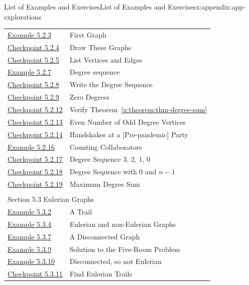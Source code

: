 \documentclass[oneside,10pt,]{book}
\newcommand{\xreffont}{\relax}
\numberwithin{equation}{section}
\begin{document}
\begin{appendixptx}{List of Examples and Exercises}{}{List of Examples and Exercises}{}{}{x:appendix:app-explorations}
\begin{longtable}[l]{ll}
\hyperref[x:example:eg-graph-first]{Example 5.2.3}& First Graph\\
\hyperref[x:exercise:ex-graph-first-draw]{Checkpoint 5.2.4}& Draw These Graphs\\
\hyperref[x:exercise:ex-graph-first-list]{Checkpoint 5.2.5}& List Vertices and Edges\\
\hyperref[x:example:eg-graph-degree]{Example 5.2.7}& Degree sequence\\
\hyperref[x:exercise:ex-graph-degree]{Checkpoint 5.2.8}& Write the Degree Sequence\\
\hyperref[x:exercise:ex-graph-degree-zero]{Checkpoint 5.2.9}& Zero Degrees\\
\hyperref[x:exercise:ex-graph-degsum]{Checkpoint 5.2.12}& Verify Theorem~{\xreffont\ref*{x:theorem:thm-degree-sum}}\\
\hyperref[x:exercise:ex-graph-handshake]{Checkpoint 5.2.13}& Even Number of Odd Degree Vertices\\
\hyperref[x:exercise:ex-graph-handshake-lemma]{Checkpoint 5.2.14}& Handshakes at a [Pre-pandemic] Party\\
\hyperref[x:example:eg-graph-coauthors-answer]{Example 5.2.16}& Counting Collaborators\\
\hyperref[x:exercise:ex-graph-degree-0-4]{Checkpoint 5.2.17}& Degree Sequence 3, 2, 1, 0\\
\hyperref[x:exercise:ex-graph-degree-0-n-1]{Checkpoint 5.2.18}& Degree Sequence with 0 and \(n-1\)\\
\hyperref[x:exercise:ex-graph-degree-sum-max]{Checkpoint 5.2.19}& Maximum Degree Sum\\
\multicolumn{2}{l}{\null}\\[1.5ex] \multicolumn{2}{l}{\large Section 5.3 Eulerian Graphs}\\[0.5ex]
\hyperref[x:example:eg-graph-trail]{Example 5.3.2}& A Trail\\
\hyperref[x:example:eg-graph-eulerian]{Example 5.3.4}& Eulerian and non-Eulerian Graphs\\
\hyperref[x:example:eg-graph-connected]{Example 5.3.7}& A Disconnected Graph\\
\hyperref[x:example:eg-graph-model-room-solution]{Example 5.3.9}& Solution to the Five-Room Problem\\
\hyperref[x:example:eg-graph-not-eulerian]{Example 5.3.10}& Disconnected, so not Eulerian\\
\hyperref[x:exercise:ex-graph-find-eulerian-trail]{Checkpoint 5.3.11}& Find Eulerian Trails\\

\end{longtable}
\end{appendixptx}
\end{document}
